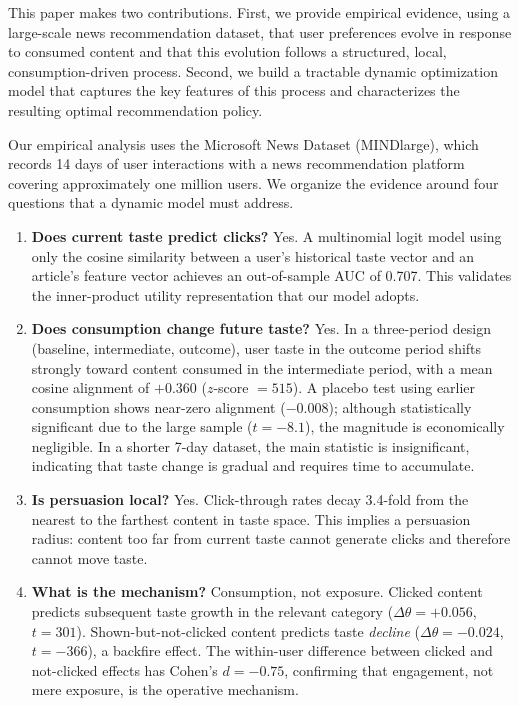 \documentclass[11pt]{article}
\begin{document}
This paper makes two contributions. First, we provide empirical evidence, using a large-scale news recommendation dataset, that user preferences evolve in response to consumed content and that this evolution follows a structured, local, consumption-driven process. Second, we build a tractable dynamic optimization model that captures the key features of this process and characterizes the resulting optimal recommendation policy.

Our empirical analysis uses the Microsoft News Dataset (MINDlarge), which records 14 days of user interactions with a news recommendation platform covering approximately one million users. We organize the evidence around four questions that a dynamic model must address.

\begin{enumerate}[leftmargin=2em, itemsep=0.3em]
\item \textbf{Does current taste predict clicks?} Yes. A multinomial logit model using only the cosine similarity between a user's historical taste vector and an article's feature vector achieves an out-of-sample AUC of 0.707. This validates the inner-product utility representation that our model adopts.

\item \textbf{Does consumption change future taste?} Yes. In a three-period design (baseline, intermediate, outcome), user taste in the outcome period shifts strongly toward content consumed in the intermediate period, with a mean cosine alignment of $+0.360$ ($z$-score $= 515$). A placebo test using earlier consumption shows near-zero alignment ($-0.008$); although statistically significant due to the large sample ($t = -8.1$), the magnitude is economically negligible. In a shorter 7-day dataset, the main statistic is insignificant, indicating that taste change is gradual and requires time to accumulate.

\item \textbf{Is persuasion local?} Yes. Click-through rates decay 3.4-fold from the nearest to the farthest content in taste space. This implies a persuasion radius: content too far from current taste cannot generate clicks and therefore cannot move taste.

\item \textbf{What is the mechanism?} Consumption, not exposure. Clicked content predicts subsequent taste growth in the relevant category ($\Delta\theta = +0.056$, $t = 301$). Shown-but-not-clicked content predicts taste \emph{decline} ($\Delta\theta = -0.024$, $t = -366$), a backfire effect. The within-user difference between clicked and not-clicked effects has Cohen's $d = -0.75$, confirming that engagement, not mere exposure, is the operative mechanism.
\end{enumerate}
\end{document}
